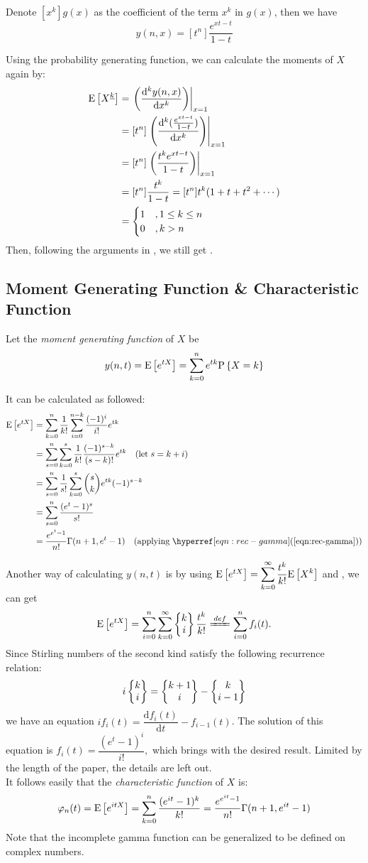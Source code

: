Denote $ [x^k]g(x)$ as the coefficient of the term $ x^k$ in $ g(x)$, then we have
\[ y(n,x) = [t^n]\dfrac{e^{xt-t}}{1-t}\]

Using the probability generating function, we can calculate the moments of $ X$ again by:
\begin{align*}
  \text{E}\left[X^{\underline{k}}\right] &= \left. \left( \dfrac{\mathrm{d}^k y(n,x)}{\mathrm{d}x^k}\right) \right|_{x=1} \\
  & = [t^n]\left. \left( \dfrac{\mathrm{d}^k(\frac{e^{xt-t}}{1-t})}{\mathrm{d}x^k}\right)\right|_{x=1}\\
  &=[t^n]\left. \left( \dfrac{t^ke^{xt-t}}{1-t}\right)\right|_{x=1}\\
  &=[t^n]\dfrac{t^k}{1-t} = [t^n]t^k(1+t+t^2+\cdots )\\
  &=\begin{cases}1 \quad ,1\le k \le n \\ 0 \quad , k > n\end{cases}
\end{align*}
Then, following the arguments in ,
we still get .

\subsection{Moment Generating Function \& Characteristic Function}
Let the \emph{moment generating function} of $ X$ be
\[ y(n, t) = \E{e^{tX}} = \sum_{k=0}^{n}e^{tk}\Pr{X=k} \]

It can be calculated as followed:
\begin{align*}
  \E{e^{tX}} &=\sum_{k=0}^n\dfrac{1}{k!}\sum_{i=0}^{n-k}\dfrac{(-1)^i}{i!}e^{tk} \\
  &=\sum_{s=0}^n\sum_{k=0}^s\dfrac{1}{k!}\dfrac{(-1)^{s-k}}{(s-k)!}e^{tk} \quad (\text{let}\; s = k+i)\\
  &=\sum_{s=0}^n\dfrac{1}{s!}\sum_{k=0}^{s}{s\choose k}e^{tk}(-1)^{s-k} \\
  &=\sum_{s=0}^n\dfrac{(e^t-1)^s}{s!}\\
  &=\dfrac{e^{e^t-1}}{n!}\Gamma(n+1, e^t-1) \quad (\text{applying}\; \eqnref{rec-gamma})
\end{align*}

Another way of calculating $y(n,t)$ is by using
$ \E{e^{tX}} = \sum_{k=0}^{\infty}\dfrac{t^k}{k!}\E{X^k}$ and , we can get
\[ \E{e^{tX}} = \sum_{i=0}^n\sum_{k=0}^{\infty}\Stir{k}{i}\dfrac{t^k}{k!} \xlongequal{def}\sum_{i=0}^nf_i(t).\]
Since Stirling numbers of the second kind satisfy the following recurrence relation:
\[ i\left\{\begin{matrix}k\\i\end{matrix}\right\} = \left\{\begin{matrix}k+1\\i\end{matrix}\right\}-\left\{\begin{matrix}k\\i-1\end{matrix}\right\}\]
we have an equation $ if_i(t) = \dfrac{\mathrm{d}f_i(t)}{\mathrm{d}t}-f_{i-1}(t)$. The solution of this equation is
$ f_i(t) = \dfrac{(e^t-1)^i}{i!}, $ which brings with the desired result.
Limited by the length of the paper, the details are left out.
\\

It follows easily that the \emph{characteristic function} of $ X$ is:
\[ \varphi_n(t)=\E{e^{itX}}  =\sum_{k=0}^n\dfrac{(e^{it}-1)^k}{k!} =\dfrac{e^{e^{it}-1}}{n!}\Gamma(n+1, e^{it}-1) \]
Note that the incomplete gamma function can be generalized to be defined on complex numbers.
